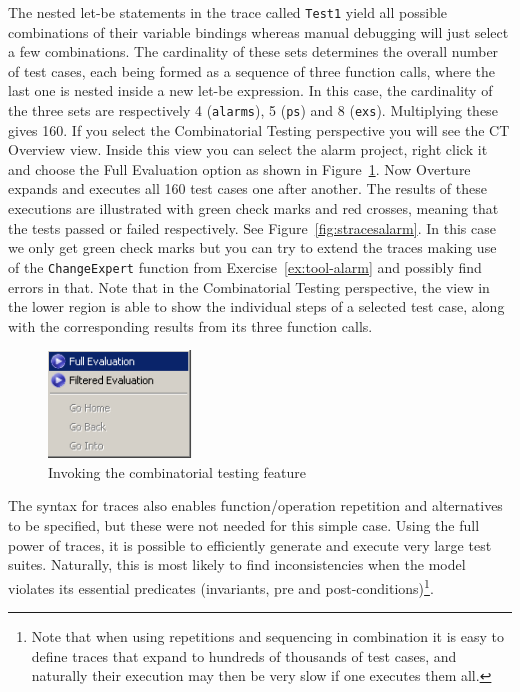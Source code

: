 %
\noindent The nested let-be statements in the trace called \texttt{Test1} yield all possible combinations of their variable bindings whereas manual debugging will just select a few combinations. The cardinality of these sets determines the overall number of test cases, each being formed as a sequence of three function calls, where the last one is nested inside a new let-be expression. In this case, the cardinality of the three sets are respectively 4 (\texttt{alarms}), 5 (\texttt{ps}) and 8 (\texttt{exs}). Multiplying these gives 160. If you select the Combinatorial Testing perspective you will see the \textsf{CT Overview} view. Inside this view you can select the alarm project, right click it and choose the \textsf{Full Evaluation} option as shown in Figure~\ref{fig:CToptions}.  Now Overture expands and executes all 160 test cases one after another. The results of these executions are illustrated with green
check marks and red crosses, meaning that the tests passed or failed respectively.  See Figure~\ref{fig:stracesalarm}. In this case we only get green check marks but you can try to extend the traces making use of the \texttt{ChangeExpert} function from Exercise~\ref{ex:tool-alarm} and possibly find errors in that. Note that in the Combinatorial Testing perspective, the view in the lower region is able to show the individual steps of a selected test case, along with the corresponding results from its three function calls.
%
\begin{figure}[htbp]
\begin{center}
\includegraphics[width=1.5in]{figures/CToptions}
\caption{Invoking the combinatorial testing feature\label{fig:CToptions}}
\end{center}
\end{figure}
%
The syntax for traces also enables function/operation repetition and alternatives to be specified, but these were not needed for this simple case. Using the full power of traces, it is possible to efficiently generate and execute very large test suites. Naturally, this is most likely to find inconsistencies when the model violates its essential predicates (invariants, pre and post-conditions)\footnote{Note that when using repetitions and sequencing in combination it is easy to define traces that expand to hundreds of thousands of test cases, and naturally their execution may then be very slow if one executes them all.}.

